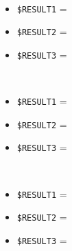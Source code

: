 \documentclass[../../SperimentazioniPratiche.tex]{subfiles}
\begin{document}
\begin{tcolorbox}[fonttitle=\bfseries, 
								adjusted title={\Large Prova 4A.1}, 
								breakable, 
								sharp corners=south,
								colback=white, 
								colframe=white!60!black]
\begin{description}[leftmargin=0.7cm,labelwidth=!]
\begin{description}
        					\item[\dispositivoA] \ \par
        					\begin{itemize}
        						\item \verb|$RESULT1| = \ok
        						\item \verb|$RESULT2| = \ok
        						\item \verb|$RESULT3| = \ok
        					\end{itemize}      					
        					
        					\item[\dispositivoB] \ \par
        					\begin{itemize}
        						\item \verb|$RESULT1| = \ok
        						\item \verb|$RESULT2| = \ok
        						\item \verb|$RESULT3| = \ok
        					\end{itemize}
        					
        					\item[\dispositivoC] \ \par
        					\begin{itemize}
        						\item \verb|$RESULT1| = \ok
        						\item \verb|$RESULT2| = \ok
        						\item \verb|$RESULT3| = \ok
        					\end{itemize}
        					
        				\end{description}
        				
        				
				\end{description}  
				
			\end{tcolorbox}



	
	\newpage	
\end{document}

